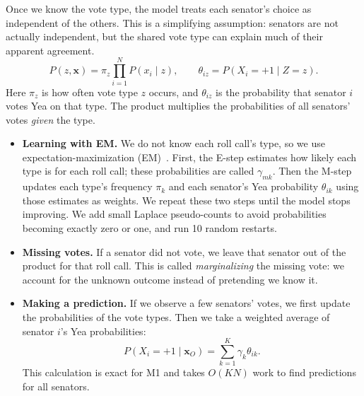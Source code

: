 \documentclass[10pt]{article}
\begin{document}
Once we know the vote type, the model treats each senator's choice as independent of the others. This is a simplifying assumption: senators are not actually independent, but the shared vote type can explain much of their apparent agreement.
\begin{equation}
P(z,\mathbf x)=\pi_z\prod_{i=1}^{N}P(x_i\mid z),\qquad \theta_{iz}=P(X_i{=}{+}1\mid Z{=}z).
\end{equation}
Here $\pi_z$ is how often vote type $z$ occurs, and $\theta_{iz}$ is the probability that senator $i$ votes Yea on that type. The product multiplies the probabilities of all senators' votes \emph{given} the type.
\begin{itemize}
\item \textbf{Learning with EM.} We do not know each roll call's type, so we use expectation-maximization (EM)~\cite{dempster1977}. First, the E-step estimates how likely each type is for each roll call; these probabilities are called $\gamma_{mk}$. Then the M-step updates each type's frequency $\pi_k$ and each senator's Yea probability $\theta_{ik}$ using those estimates as weights. We repeat these two steps until the model stops improving. We add small Laplace pseudo-counts to avoid probabilities becoming exactly zero or one, and run 10 random restarts.
\item \textbf{Missing votes.} If a senator did not vote, we leave that senator out of the product for that roll call. This is called \emph{marginalizing} the missing vote: we account for the unknown outcome instead of pretending we know it.
\item \textbf{Making a prediction.} If we observe a few senators' votes, we first update the probabilities of the vote types. Then we take a weighted average of senator $i$'s Yea probabilities:
\begin{equation}
P(X_i{=}{+}1\mid\mathbf x_O)=\sum_{k=1}^{K}\gamma_k\theta_{ik}.
\end{equation}
This calculation is exact for M1 and takes $O(KN)$ work to find predictions for all senators.
\end{itemize}
\end{document}

